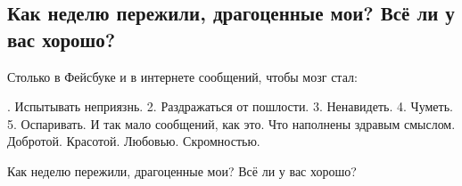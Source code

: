  
 
 

\subsection{Как неделю пережили, драгоценные мои? Всё ли у вас хорошо?}
\label{sec:06_11_2020.fb.roman_barashev.1.vse_li_u_vas_horosho}

Столько в Фейсбуке и в интернете сообщений, чтобы мозг стал:

. Испытывать неприязнь.
2. Раздражаться от пошлости.
3. Ненавидеть.
4. Чуметь. 
5. Оспаривать.
И так мало сообщений, как это. 
Что наполнены здравым смыслом.
Добротой.
Красотой.
Любовью.
Скромностью. 
\restorecr

Как неделю пережили, драгоценные мои? Всё ли у вас хорошо?
